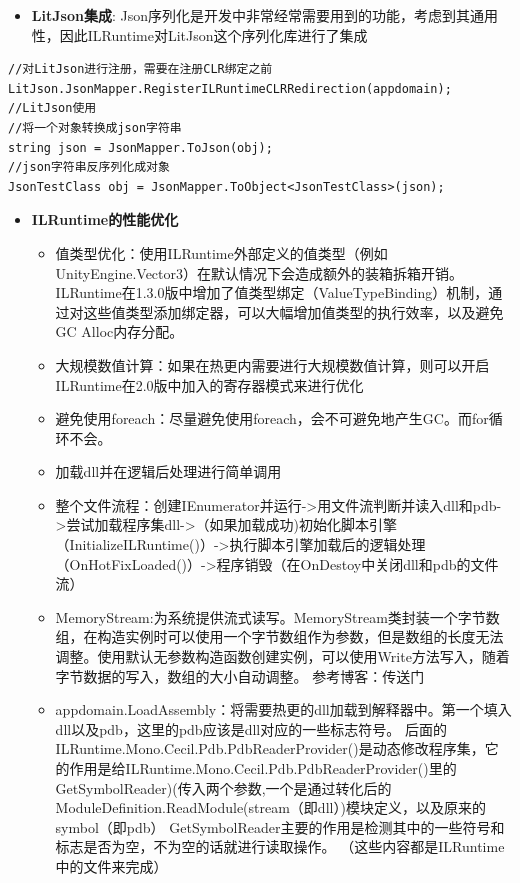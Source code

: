 \documentclass[9pt, b5paper]{article}
\begin{document}
\begin{itemize}
\item \textbf{LitJson集成}: Json序列化是开发中非常经常需要用到的功能，考虑到其通用性，因此ILRuntime对LitJson这个序列化库进行了集成
\end{itemize}
\begin{verbatim}
//对LitJson进行注册，需要在注册CLR绑定之前
LitJson.JsonMapper.RegisterILRuntimeCLRRedirection(appdomain);
//LitJson使用
//将一个对象转换成json字符串
string json = JsonMapper.ToJson(obj);
//json字符串反序列化成对象
JsonTestClass obj = JsonMapper.ToObject<JsonTestClass>(json);
\end{verbatim}
\begin{itemize}
\item \textbf{ILRuntime的性能优化}
\begin{itemize}
\item 值类型优化：使用ILRuntime外部定义的值类型（例如UnityEngine.Vector3）在默认情况下会造成额外的装箱拆箱开销。ILRuntime在1.3.0版中增加了值类型绑定（ValueTypeBinding）机制，通过对这些值类型添加绑定器，可以大幅增加值类型的执行效率，以及避免GC Alloc内存分配。
\item 大规模数值计算：如果在热更内需要进行大规模数值计算，则可以开启ILRuntime在2.0版中加入的寄存器模式来进行优化
\item 避免使用foreach：尽量避免使用foreach，会不可避免地产生GC。而for循环不会。
\item 加载dll并在逻辑后处理进行简单调用
\item 整个文件流程：创建IEnumerator并运行->用文件流判断并读入dll和pdb->尝试加载程序集dll->（如果加载成功)初始化脚本引擎（InitializeILRuntime()）->执行脚本引擎加载后的逻辑处理（OnHotFixLoaded()）->程序销毁（在OnDestoy中关闭dll和pdb的文件流）
\item MemoryStream:为系统提供流式读写。MemoryStream类封装一个字节数组，在构造实例时可以使用一个字节数组作为参数，但是数组的长度无法调整。使用默认无参数构造函数创建实例，可以使用Write方法写入，随着字节数据的写入，数组的大小自动调整。 参考博客：传送门
\item appdomain.LoadAssembly：将需要热更的dll加载到解释器中。第一个填入dll以及pdb，这里的pdb应该是dll对应的一些标志符号。 后面的ILRuntime.Mono.Cecil.Pdb.PdbReaderProvider()是动态修改程序集，它的作用是给ILRuntime.Mono.Cecil.Pdb.PdbReaderProvider()里的GetSymbolReader)(传入两个参数,一个是通过转化后的ModuleDefinition.ReadModule(stream（即dll）)模块定义，以及原来的symbol（即pdb） GetSymbolReader主要的作用是检测其中的一些符号和标志是否为空，不为空的话就进行读取操作。 （这些内容都是ILRuntime中的文件来完成）

\end{itemize}
\end{itemize}
\end{document}
